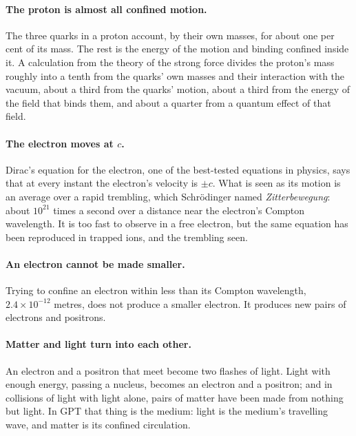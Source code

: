 \documentclass[11pt,a4paper]{article}
\begin{document}
\paragraph{The proton is almost all confined motion.} The three quarks in a proton account, by their own masses, for about one per cent of its mass. The rest is the energy of the motion and binding confined inside it. A calculation from the theory of the strong force divides the proton's mass roughly into a tenth from the quarks' own masses and their interaction with the vacuum, about a third from the quarks' motion, about a third from the energy of the field that binds them, and about a quarter from a quantum effect of that field. 

\paragraph{The electron moves at $c$.} Dirac's equation for the electron, one of the best-tested equations in physics, says that at every instant the electron's velocity is $\pm c$. What is seen as its motion is an average over a rapid trembling, which Schr\"odinger named \emph{Zitterbewegung}: about $10^{21}$ times a second over a distance near the electron's Compton wavelength. It is too fast to observe in a free electron, but the same equation has been reproduced in trapped ions, and the trembling seen.

\paragraph{An electron cannot be made smaller.} Trying to confine an electron within less than its Compton wavelength, $2.4\times10^{-12}$ metres, does not produce a smaller electron. It produces new pairs of electrons and positrons.

\paragraph{Matter and light turn into each other.} An electron and a positron that meet become two flashes of light. Light with enough energy, passing a nucleus, becomes an electron and a positron; and in collisions of light with light alone, pairs of matter have been made from nothing but light.  In GPT that thing is the medium: light is the medium's travelling wave, and matter is its confined circulation.
\end{document}
